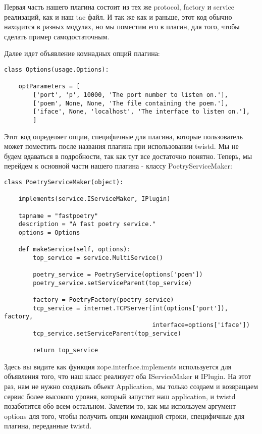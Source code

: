 Первая часть нашего плагина состоит из тех же 
protocol, factory и service реализаций, как и наш 
tac файл. И так же как и раньше, этот код обычно находится 
в разных модулях, но мы поместим его в плагин, для того, чтобы 
сделать пример самодостаточным.


Далее идет объявление комнадных опций плагина:

 \begin{verbatim}
class Options(usage.Options):

    optParameters = [
        ['port', 'p', 10000, 'The port number to listen on.'],
        ['poem', None, None, 'The file containing the poem.'],
        ['iface', None, 'localhost', 'The interface to listen on.'],
        ]
\end{verbatim} 


Этот код определяет опции, специфичные для плагина, которые 
пользователь может поместить после названия 
плагина при использовании twistd. Мы не будем вдаваться в 
подробности, так как тут все достаточно понятно. Теперь, мы 
перейдем к основной части нашего плагина - классу PoetryServiceMaker: 


 \begin{verbatim}
class PoetryServiceMaker(object):

    implements(service.IServiceMaker, IPlugin)

    tapname = "fastpoetry"
    description = "A fast poetry service."
    options = Options

    def makeService(self, options):
        top_service = service.MultiService()

        poetry_service = PoetryService(options['poem'])
        poetry_service.setServiceParent(top_service)

        factory = PoetryFactory(poetry_service)
        tcp_service = internet.TCPServer(int(options['port']), factory,
                                         interface=options['iface'])
        tcp_service.setServiceParent(top_service)

        return top_service
\end{verbatim} 


Здесь вы видите как функция zope.interface.implements используется для 
объявления того, что наш класс реализует оба IServiceMaker и IPlugin. 
На этот раз, нам не нужно создавать объект Application, мы только 
создаем и возвращаем сервис более высокого уровня, который запустит наш 
application, и twistd позаботится обо всем остальном. Заметим то, как мы 
используем аргумент options для того, чтобы получить опции 
командной строки, специфичные для плагина, переданные twistd.



